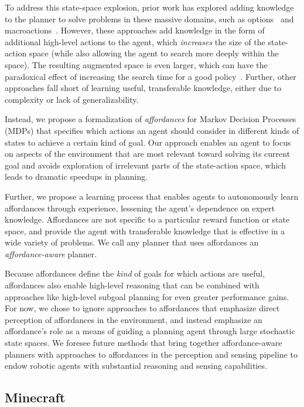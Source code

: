 \documentclass[letterpaper]{article}
\begin{document}
To address this state-space explosion, prior work has explored adding
knowledge to the planner to solve problems in these
massive domains, such as options~\cite{sutton99} and
macroactions~\cite{Botea:2005kx,Newton:2005vn}. However, these
approaches add knowledge in the form of additional high-level actions
to the agent, which {\em increases} the size of the state-action space
(while also allowing the agent to search more deeply within the
space).  The resulting augmented space is even larger, which can have
the paradoxical effect of increasing the search time for a good
policy~\cite{Jong:2008zr}. Further, other approaches fall short of learning useful, transferable knowledge,
either due to complexity or lack of generalizability.

Instead, we propose a formalization of {\em affordances} \cite{gibson77} for Markov Decision Processes (MDPs) that
specifies which actions an agent should consider in different kinds of states to achieve a certain kind of goal.
Our approach enables an agent to focus on
aspects of the environment that are most relevant toward solving its current goal 
and avoids exploration of irrelevant parts of the 
state-action space, which leads to dramatic speedups in planning.

Further, we propose a learning process that
enables agents to autonomously learn affordances through experience, lessening
the agent's dependence on expert knowledge. Affordances are not specific to a particular reward 
function or state space, and provide the agent with transferable 
knowledge that is effective in a wide variety of problems. We call any planner that
uses affordances an {\it affordance-aware} planner.

Because affordances define the {\em kind} of goals for which actions are useful,
affordances also enable high-level reasoning that can
be combined with approaches like high-level subgoal planning for even
greater performance gains. For now, we chose to ignore approaches to affordances that emphasize
direct perception of affordances in the environment, and instead emphasize an
affordance's role as a means of guiding a planning agent through large stochastic state spaces. We foresee
future methods that bring together affordance-aware planners with approaches to affordances
in the perception and sensing pipeline to endow robotic agents with substantial reasoning and sensing capabilities.

\subsection{Minecraft}
\end{document}
